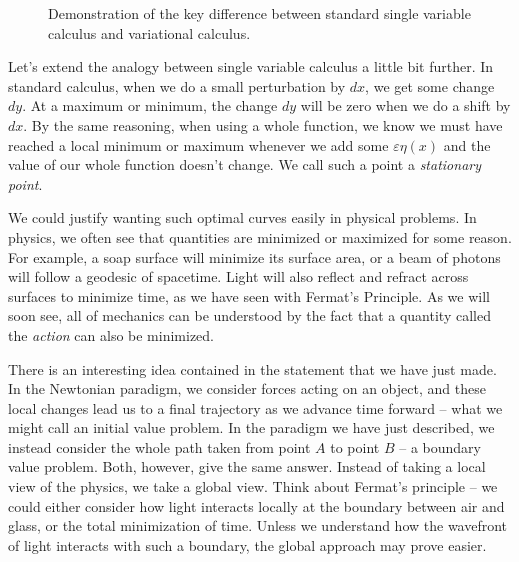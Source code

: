 \begin{figure}[ht]
    
    \caption{Demonstration of the key difference between standard single variable calculus and variational calculus.}
    \label{fig:variational calc}
\end{figure}
Let's extend the analogy between single variable calculus a little bit further. In standard calculus, when we do a small perturbation by $dx$, we get some change $dy$. At a maximum or minimum, the change $dy$ will be zero when we do a shift by $dx$. By the same reasoning, when using a whole function, we know we must have reached a local minimum or maximum whenever we add some $\varepsilon\eta(x)$ and the value of our whole function doesn't change. We call such a point a \textit{stationary point}.

We could justify wanting such optimal curves easily in physical problems. In physics, we often see that quantities are minimized or maximized for some reason. For example, a soap surface will minimize its surface area, or a beam of photons will follow a \gls{geodesic} of spacetime. Light will also reflect and refract across surfaces to minimize time, as we have seen with Fermat's Principle. As we will soon see, all of mechanics can be understood by the fact that a quantity called the \textit{action} can also be minimized.

There is an interesting idea contained in the statement that we have just made. In the Newtonian paradigm, we consider forces acting on an object, and these local changes lead us to a final trajectory as we advance time forward -- what we might call an initial value problem. In the paradigm we have just described, we instead consider the whole path taken from point $A$ to point $B$ -- a boundary value problem. Both, however, give the same answer. Instead of taking a local view of the physics, we take a global view. Think about Fermat's principle -- we could either consider how light interacts locally at the boundary between air and glass, or the total minimization of time. Unless we understand how the wavefront of light interacts with such a boundary, the global approach may prove easier.

